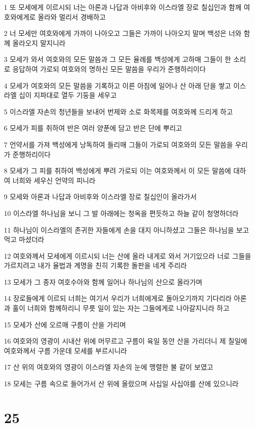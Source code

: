 \par 1 또 모세에게 이르시되 너는 아론과 나답과 아비후와 이스라엘 장로 칠십인과 함께 여호와에게로 올라와 멀리서 경배하고
\par 2 너 모세만 여호와에게 가까이 나아오고 그들은 가까이 나아오지 말며 백성은 너와 함께 올라오지 말지니라
\par 3 모세가 와서 여호와의 모든 말씀과 그 모든 율례를 백성에게 고하매 그들이 한 소리로 응답하여 가로되 여호와의 명하신 모든 말씀을 우리가 준행하리이다
\par 4 모세가 여호와의 모든 말씀을 기록하고 이른 아침에 일어나 산 아래 단을 쌓고 이스라엘 십이 지파대로 열두 기둥을 세우고
\par 5 이스라엘 자손의 청년들을 보내어 번제와 소로 화목제를 여호와께 드리게 하고
\par 6 모세가 피를 취하여 반은 여러 양푼에 담고 반은 단에 뿌리고
\par 7 언약서를 가져 백성에게 낭독하여 들리매 그들이 가로되 여호와의 모든 말씀을 우리가 준행하리이다
\par 8 모세가 그 피를 취하여 백성에게 뿌려 가로되 이는 여호와께서 이 모든 말씀에 대하여 너희와 세우신 언약의 피니라
\par 9 모세와 아론과 나답과 아비후와 이스라엘 장로 칠십인이 올라가서
\par 10 이스라엘 하나님을 보니 그 발 아래에는 청옥을 편듯하고 하늘 같이 청명하더라
\par 11 하나님이 이스라엘의 존귀한 자들에게 손을 대지 아니하셨고 그들은 하나님을 보고 먹고 마셨더라
\par 12 여호와께서 모세에게 이르시되 너는 산에 올라 내게로 와서 거기있으라 너로 그들을 가르치려고 내가 율법과 계명을 친히 기록한 돌판을 네게 주리라
\par 13 모세가 그 종자 여호수아와 함께 일어나 하나님의 산으로 올라가며
\par 14 장로들에게 이르되 너희는 여기서 우리가 너희에게로 돌아오기까지 기다리라 아론과 훌이 너희와 함께하리니 무릇 일이 있는 자는 그들에게로 나아갈지니라 하고
\par 15 모세가 산에 오르매 구름이 산을 가리며
\par 16 여호와의 영광이 시내산 위에 머무르고 구름이 육일 동안 산을 가리더니 제 칠일에 여호와께서 구름 가운데 모세를 부르시니라
\par 17 산 위의 여호와의 영광이 이스라엘 자손의 눈에 맹렬한 불 같이 보였고
\par 18 모세는 구름 속으로 들어가서 산 위에 올랐으며 사십일 사십야를 산에 있으니라

\chapter{25}

